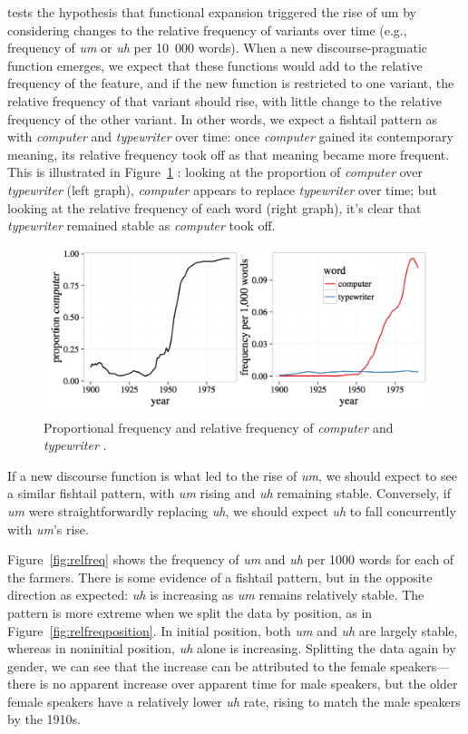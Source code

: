 \documentclass[11pt]{article}
\begin{document}
\textcite{fruehwald2016} tests the hypothesis that functional expansion
triggered the rise of um by considering changes to the relative frequency of
variants over time (e.g., frequency of \emph{um} or \emph{uh} per 10~000 words).
When a new discourse-pragmatic function emerges, we expect that these functions
would add to the relative frequency of the feature, and if the new function is
restricted to one variant, the relative frequency of that variant should rise,
with little change to the relative frequency of the other variant.
In other words, we expect a fishtail pattern as with \emph{computer} and
\emph{typewriter} over time: once \emph{computer} gained its contemporary
meaning, its relative frequency took off as that meaning became more frequent.
This is illustrated in Figure~\ref{fig:fishtail} \parencite[Figure 3
from][]{fruehwald2016}: looking at the proportion of \emph{computer} over
\emph{typewriter} (left graph), \emph{computer} appears to replace
\emph{typewriter} over time; but looking at the relative frequency of each word
(right graph), it's clear that \emph{typewriter} remained stable as
\emph{computer} took off.

\begin{figure}[htpb]
    \centering
    \includegraphics[width=0.8\linewidth]{figures/fishtail.png}
    \caption{Proportional frequency and relative frequency of \emph{computer}
    and \emph{typewriter} \parencite[Figure 3 from][]{fruehwald2016}.}
    \label{fig:fishtail}
\end{figure}

If a new discourse function is what led to the rise of \emph{um}, we should
expect to see a similar fishtail pattern, with \emph{um} rising and \emph{uh}
remaining stable.
Conversely, if \emph{um} were straightforwardly replacing \emph{uh}, we should
expect \emph{uh} to fall concurrently with \emph{um}'s rise.

Figure~\ref{fig:relfreq} shows the frequency of \emph{um} and \emph{uh} per 1000
words for each of the farmers.
There is some evidence of a fishtail pattern, but in the opposite direction as
expected: \emph{uh} is increasing as \emph{um} remains relatively stable.
The pattern is more extreme when we split the data by position, as in
Figure~\ref{fig:relfreqposition}.
In initial position, both \emph{um} and \emph{uh} are largely stable, whereas in
noninitial position, \emph{uh} alone is increasing.
Splitting the data again by gender, we can see that the increase can be
attributed to the female speakers---%
there is no apparent increase over apparent time for male speakers,
but the older female speakers have a relatively lower \emph{uh} rate, rising to
match the male speakers by the 1910s.
\end{document}
